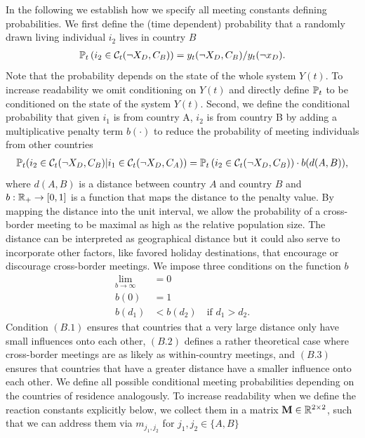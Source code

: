 In the following we establish how we specify all meeting constants defining probabilities. We first define the (time dependent) probability that a randomly drawn living individual $i_2$ lives in country $B$ 
\begin{align}
\mathbb{P}_t\left(i_2 \in \mathcal{C}_t(\neg X_D, C_B)\right) =y_t(\neg X_D, C_B) / y_t(\neg x_D).
\end{align}
Note that the probability depends on the state of the whole system $Y(t)$. To increase readability we omit conditioning on $Y(t)$ and directly define $\mathbb{P}_t$ to be conditioned on the state of the system $Y(t)$.  
Second, we define the conditional probability that given $i_1$ is from country A, $i_2$ is from country B by adding a multiplicative penalty term $b(\cdot)$ to reduce the probability of meeting individuals from other countries
\begin{align}
\label{eq:prob_cross_border}
\mathbb{P}_t(i_2 \in \mathcal{C}_t(\neg X_D, C_B) | i_1 \in \mathcal{C}_t(\neg X_D, C_A) ) = \mathbb{P}_t\left(i_2 \in \mathcal{C}_t(\neg X_D, C_B)\right) \cdot b(d(A, B)),
\end{align}
where $d(A, B)$ is a distance between country $A$ and country $B$ and $b: \mathbb{R}_+ \to [0,1]$  is a function that maps the distance to the penalty value. By mapping the distance into the unit interval, we allow the probability of a cross-border meeting to be maximal as high as the relative population size. The distance can be interpreted as geographical distance but it could also serve to incorporate other factors, like favored holiday destinations, that encourage or discourage cross-border meetings. We impose three conditions on the function $b$
\begin{align}
\lim_{b \to \infty} &= 0 \tag{B.1}\\
b(0) &= 1 \tag{B.2}\\
b(d_1) &< b(d_2) \quad \textrm{if } d_1 > d_2. \tag{B.3}
\end{align}
Condition $(B.1)$ ensures that countries that a very large distance only have small influences onto each other, $(B.2)$ defines a rather theoretical case where cross-border meetings are as likely as within-country meetings, and $(B.3)$ ensures that countries that have a greater distance have a smaller influence onto each other. We define all possible conditional meeting probabilities depending on the countries of residence analogously. To increase readability when we define the reaction constants explicitly below, we collect them in a matrix $\mathbf{M} \in \mathbb{R}^{2 \times 2}$, such that we can address them via $m_{j_1,j_2}$ for $j_1, j_2 \in \{A, B\}$
